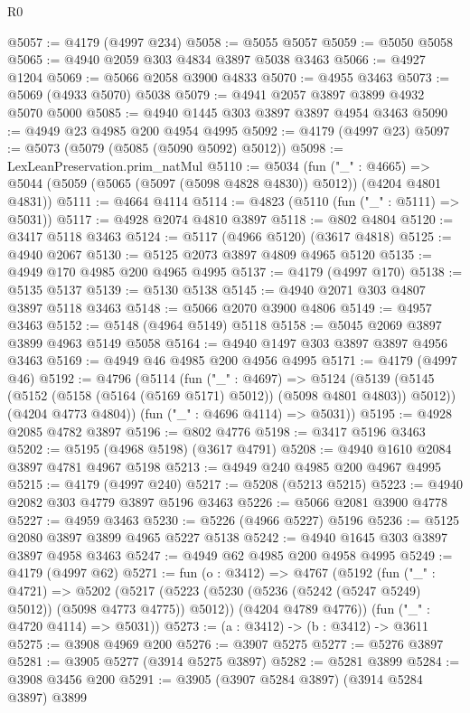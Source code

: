 \begin{lexlean}{R0}
\begin{coremodule}
@5057 := @4179 (@4997 @234)
@5058 := @5055 @5057
@5059 := @5050 @5058
@5065 := @4940 @2059 @303 @4834 @3897 @5038 @3463
@5066 := @4927 @1204
@5069 := @5066 @2058 @3900 @4833
@5070 := @4955 @3463
@5073 := @5069 (@4933 @5070) @5038
@5079 := @4941 @2057 @3897 @3899 @4932 @5070 @5000
@5085 := @4940 @1445 @303 @3897 @3897 @4954 @3463
@5090 := @4949 @23 @4985 @200 @4954 @4995
@5092 := @4179 (@4997 @23)
@5097 := @5073 (@5079 (@5085 (@5090 @5092) @5012))
@5098 := LexLeanPreservation.prim_natMul
@5110 := @5034
    (fun ("_" : @4665) =>
    @5044 (@5059 (@5065 (@5097 (@5098 @4828 @4830)) @5012)) (@4204 @4801 @4831))
@5111 := @4664 @4114
@5114 := @4823 (@5110 (fun ("_" : @5111) => @5031))
@5117 := @4928 @2074 @4810 @3897
@5118 := @802 @4804
@5120 := @3417 @5118 @3463
@5124 := @5117 (@4966 @5120) (@3617 @4818)
@5125 := @4940 @2067
@5130 := @5125 @2073 @3897 @4809 @4965 @5120
@5135 := @4949 @170 @4985 @200 @4965 @4995
@5137 := @4179 (@4997 @170)
@5138 := @5135 @5137
@5139 := @5130 @5138
@5145 := @4940 @2071 @303 @4807 @3897 @5118 @3463
@5148 := @5066 @2070 @3900 @4806
@5149 := @4957 @3463
@5152 := @5148 (@4964 @5149) @5118
@5158 := @5045 @2069 @3897 @3899 @4963 @5149 @5058
@5164 := @4940 @1497 @303 @3897 @3897 @4956 @3463
@5169 := @4949 @46 @4985 @200 @4956 @4995
@5171 := @4179 (@4997 @46)
@5192 := @4796
    (@5114
      (fun ("_" : @4697) =>
      @5124
        (@5139 (@5145 (@5152 (@5158 (@5164 (@5169 @5171) @5012)) (@5098 @4801 @4803)) @5012))
        (@4204 @4773 @4804))
      (fun ("_" : @4696 @4114) => @5031))
@5195 := @4928 @2085 @4782 @3897
@5196 := @802 @4776
@5198 := @3417 @5196 @3463
@5202 := @5195 (@4968 @5198) (@3617 @4791)
@5208 := @4940 @1610 @2084 @3897 @4781 @4967 @5198
@5213 := @4949 @240 @4985 @200 @4967 @4995
@5215 := @4179 (@4997 @240)
@5217 := @5208 (@5213 @5215)
@5223 := @4940 @2082 @303 @4779 @3897 @5196 @3463
@5226 := @5066 @2081 @3900 @4778
@5227 := @4959 @3463
@5230 := @5226 (@4966 @5227) @5196
@5236 := @5125 @2080 @3897 @3899 @4965 @5227 @5138
@5242 := @4940 @1645 @303 @3897 @3897 @4958 @3463
@5247 := @4949 @62 @4985 @200 @4958 @4995
@5249 := @4179 (@4997 @62)
@5271 := fun (o : @3412) =>
  @4767
    (@5192
      (fun ("_" : @4721) =>
      @5202
        (@5217 (@5223 (@5230 (@5236 (@5242 (@5247 @5249) @5012)) (@5098 @4773 @4775)) @5012))
        (@4204 @4789 @4776))
      (fun ("_" : @4720 @4114) => @5031))
@5273 := (a : @3412) -> (b : @3412) -> @3611
@5275 := @3908 @4969 @200
@5276 := @3907 @5275
@5277 := @5276 @3897
@5281 := @3905 @5277 (@3914 @5275 @3897)
@5282 := @5281 @3899
@5284 := @3908 @3456 @200
@5291 := @3905 (@3907 @5284 @3897) (@3914 @5284 @3897) @3899

\end{coremodule}
\end{lexlean}
